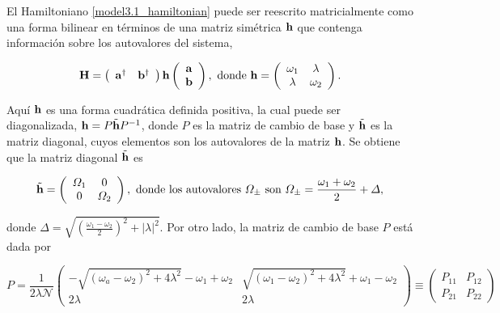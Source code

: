 \documentclass{report} %
\numberwithin{equation}{section}
\begin{document}
El Hamiltoniano \eqref{model3.1_hamiltonian} puede ser reescrito matricialmente como una forma bilinear en términos de una matriz simétrica ${\bf h}$ que contenga información sobre los autovalores del sistema, 

\begin{align}
    {\bf H} = \left(  \begin{array}{cr}
       {\bf a}^{\dagger}  & {\mathbf b}^{\dagger} \\
    \end{array} \right) 
        {\bf h} 
    \left( \begin{array}{c}
         {\bf a} \\
         {\mathbf b} 
    \end{array} \right), \textnormal{ donde } {\bf h} = \left( \begin{array}{cc}
        \omega_1 & \lambda\\ \lambda & \omega_2 
    \end{array} \right).
\end{align}

Aquí ${\bf h}$ es una forma cuadrática definida positiva, la cual puede ser diagonalizada, ${\bf h} = P\tilde{\bf h}P^{-1}$, donde $P$ es la matriz de cambio de base y $\tilde{{\bf h}}$ es la matriz diagonal, cuyos elementos son los autovalores de la matriz ${\bf h}$. Se obtiene que la matriz diagonal $\tilde{\bf h}$ es


\begin{equation}
    \tilde{\bf h} = \left(\begin{array}{cc}
    \Omega_1 & 0  \\
    0 &  \Omega_2
    \end{array}\right), \textnormal{ donde los autovalores $\Omega_{\pm}$ son } \Omega_{\pm} = \frac{\omega_1 + \omega_2}{2} + \Delta,  
\end{equation}

donde $\Delta =\sqrt{\left(\frac{\omega_1-\omega_2}{2}\right)^2 + |\lambda|^2}$. Por otro lado, la matriz de cambio de base $P$ está dada por

\begin{equation}
    P = \frac{1}{2\lambda\mathcal{N}} \left(\begin{array}{cc}
        -{\sqrt{(\omega_a - \omega_2)^2+4\lambda^2}-\omega_1 + \omega_2} &  {\sqrt{(\omega_1 - \omega_2)^2+4\lambda^2}+\omega_1 - \omega_2}\\
      {2\lambda}  & {2\lambda}
    \end{array}\right) \equiv \left(\begin{array}{cc}
        P_{11} & P_{12} \\
        P_{21} & P_{22}
    \end{array}\right)
\end{equation}
\end{document}
